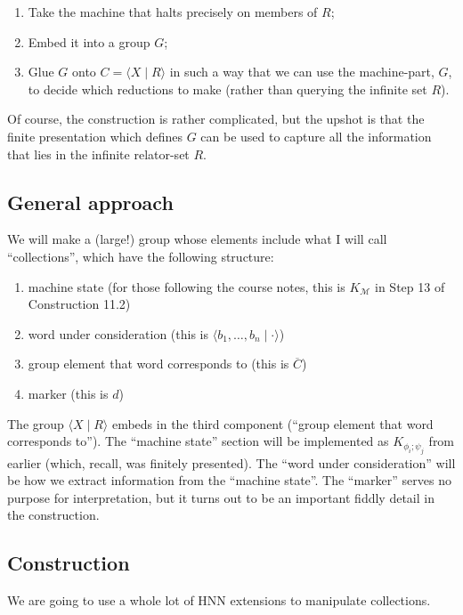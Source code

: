 \documentclass[11pt]{amsart}
\theoremstyle{remark}
\begin{document}
\begin{enumerate}
\item Take the machine that halts precisely on members of $R$;
\item Embed it into a group $G$;
\item Glue $G$ onto $C = \langle X \mid R \rangle$ in such a way that we can use the machine-part, $G$, to decide which reductions to make (rather than querying the infinite set $R$).
\end{enumerate}

Of course, the construction is rather complicated, but the upshot is that the finite presentation which defines $G$ can be used to capture all the information that lies in the infinite relator-set $R$. 

\subsection{General approach}

We will make a (large!) group whose elements include what I will call ``collections'', which have the following structure:

\begin{enumerate}
\item machine state (for those following the course notes, this is $K_{\mathcal{M}}$ in Step 13 of Construction 11.2)
\item word under consideration (this is $\langle b_1, \dots, b_n \mid \cdot \rangle$)
\item group element that word corresponds to (this is $\overline{C}$)
\item marker (this is $d$)
\end{enumerate}

The group $\langle X \mid R \rangle$ embeds in the third component (``group element that word corresponds to'').
The ``machine state'' section will be implemented as $K_{\phi_i; \psi_j}$ from earlier (which, recall, was finitely presented).
The ``word under consideration'' will be how we extract information from the ``machine state''.
The ``marker'' serves no purpose for interpretation, but it turns out to be an important fiddly detail in the construction.

\subsection{Construction}

We are going to use a whole lot of HNN extensions to manipulate collections.
\end{document}
